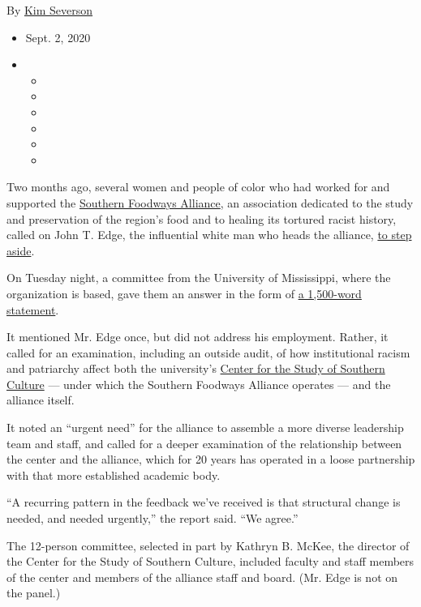 By \href{https://www.nytimes3xbfgragh.onion/by/kim-severson}{Kim
Severson}

\begin{itemize}
\item
  Sept. 2, 2020
\item
  \begin{itemize}
  \item
  \item
  \item
  \item
  \item
  \item
  \end{itemize}
\end{itemize}

Two months ago, several women and people of color who had worked for and
supported the \href{https://www.southernfoodways.org/}{Southern Foodways
Alliance}, an association dedicated to the study and preservation of the
region's food and to healing its tortured racist history, called on John
T. Edge, the influential white man who heads the alliance,
\href{https://www.nytimes3xbfgragh.onion/2020/06/29/dining/john-t-edge-southern-foodways-alliance.html}{to
step aside}.

On Tuesday night, a committee from the University of Mississippi, where
the organization is based, gave them an answer in the form of
\href{https://southernstudies.olemiss.edu/cssc-sfa-joint-statement/}{a
1,500-word statement}.

It mentioned Mr. Edge once, but did not address his employment. Rather,
it called for an examination, including an outside audit, of how
institutional racism and patriarchy affect both the university's
\href{https://southernstudies.olemiss.edu/}{Center for the Study of
Southern Culture} --- under which the Southern Foodways Alliance
operates --- and the alliance itself.

It noted an ``urgent need'' for the alliance to assemble a more diverse
leadership team and staff, and called for a deeper examination of the
relationship between the center and the alliance, which for 20 years has
operated in a loose partnership with that more established academic
body.

``A recurring pattern in the feedback we've received is that structural
change is needed, and needed urgently,'' the report said. ``We agree.''

The 12-person committee, selected in part by Kathryn B. McKee, the
director of the Center for the Study of Southern Culture, included
faculty and staff members of the center and members of the alliance
staff and board. (Mr. Edge is not on the panel.)


